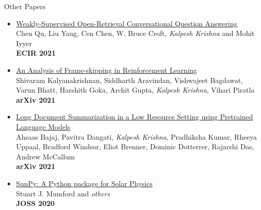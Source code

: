 \documentclass{resume} %
\begin{document}
\begin{rSection}{Other Papers}
\vspace*{0.1in}
\begin{itemize}[leftmargin=*]

\item \href{https://arxiv.org/abs/2103.02537}{Weakly-Supervised Open-Retrieval Conversational Question Answering} \\
Chen Qu, Liu Yang, Cen Chen, W. Bruce Croft, \textit{Kalpesh Krishna} and Mohit Iyyer \\
\textbf{ECIR 2021}
\item \href{https://arxiv.org/abs/2102.03718}{An Analysis of Frame-skipping in Reinforcement Learning} \\ Shivaram Kalyanakrishnan, Siddharth Aravindan, Vishwajeet Bagdawat, Varun Bhatt, Harshith Goka, Archit Gupta, \textit{Kalpesh Krishna}, Vihari Piratla \\
\textbf{arXiv 2021}
\item \href{https://arxiv.org/abs/2103.00751}{Long Document Summarization in a Low Resource Setting using Pretrained Language Models} \\ Ahsaas Bajaj, Pavitra Dangati, \textit{Kalpesh Krishna}, Pradhiksha Kumar, Rheeya Uppaal, Bradford Windsor, Eliot Brenner, Dominic Dotterrer, Rajarshi Das, Andrew McCallum \\
\textbf{arXiv 2021}

\item \href{https://joss.theoj.org/papers/10.21105/joss.01832}{SunPy: A Python package for Solar Physics} \\ Stuart J. Mumford and \textit{others} \\ \textbf{JOSS 2020}


\end{itemize}
\end{rSection}
\end{document}
